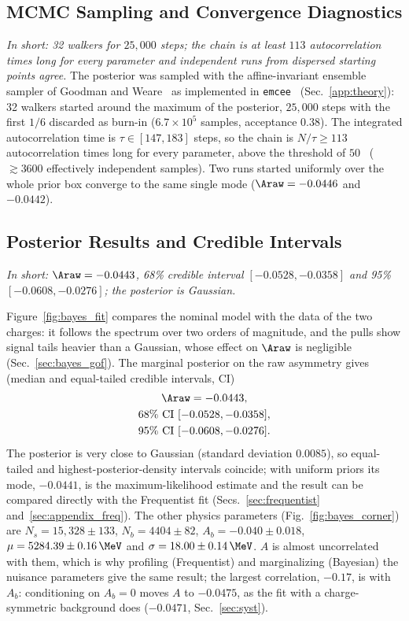 \subsection{MCMC Sampling and Convergence Diagnostics}
\label{sec:bayes_mcmc}
\emph{In short: 32 walkers for $25{,}000$ steps; the chain is at least $113$ autocorrelation times long for every parameter and independent runs from dispersed starting points agree.}
The posterior was sampled with the affine-invariant ensemble sampler of Goodman and Weare~\cite{goodman_weare} as implemented in \texttt{emcee}~\cite{emcee} (Sec.~\ref{app:theory}): 32 walkers started around the maximum of the posterior, $25{,}000$ steps with the first $1/6$ discarded as burn-in ($6.7\times10^5$ samples, acceptance $0.38$). The integrated autocorrelation time is $\tau\in[147,183]$ steps, so the chain is $N/\tau\geq113$ autocorrelation times long for every parameter, above the threshold of $50$~\cite{emcee} ($\gtrsim3600$ effectively independent samples). Two runs started uniformly over the whole prior box converge to the same single mode ($\Araw=-0.0446$ and $-0.0442$).
\subsection{Posterior Results and Credible Intervals}
\label{sec:bayes_posterior}
\emph{In short: $\Araw=-0.0443$, 68\% credible interval $[-0.0528,-0.0358]$ and 95\% $[-0.0608,-0.0276]$; the posterior is Gaussian.}

Figure~\ref{fig:bayes_fit} compares the nominal model with the data of the two charges: it follows the spectrum over two orders of magnitude, and the pulls show signal tails heavier than a Gaussian, whose effect on $\Araw$ is negligible (Sec.~\ref{sec:bayes_gof}). The marginal posterior on the raw asymmetry gives (median and equal-tailed credible intervals, CI)
\begin{gather*}
\Araw = -0.0443, \\
68\%~\text{CI}~[-0.0528,-0.0358], \\ 95\%~\text{CI}~[-0.0608,-0.0276].
\end{gather*}
The posterior is very close to Gaussian (standard deviation $0.0085$), so equal-tailed and highest-posterior-density intervals coincide; with uniform priors its mode, $-0.0441$, is the maximum-likelihood estimate and the result can be compared directly with the Frequentist fit (Secs.~\ref{sec:frequentist} and~\ref{sec:appendix_freq}). The other physics parameters (Fig.~\ref{fig:bayes_corner}) are $N_s=15{,}328\pm133$, $N_b=4404\pm82$, $A_b=-0.040\pm0.018$, $\mu=5284.39\pm0.16\,\MeV$ and $\sigma=18.00\pm0.14\,\MeV$. $A$ is almost uncorrelated with them, which is why profiling (Frequentist) and marginalizing (Bayesian) the nuisance parameters give the same result; the largest correlation, $-0.17$, is with $A_b$: conditioning on $A_b=0$ moves $A$ to $-0.0475$, as the fit with a charge-symmetric background does ($-0.0471$, Sec.~\ref{sec:syst}).

